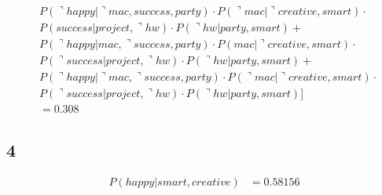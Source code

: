 \documentclass[letterpaper, 12pt]{artikel3}
\begin{document}
\begin{align*}
& P(\urcorner happy |\urcorner mac, success, party) \cdot P(\urcorner mac| \urcorner creative, smart) \cdot \\
& P(success | project,\urcorner hw) \cdot P(\urcorner hw| party, smart) +\\
& P(\urcorner happy |mac,\urcorner success, party) \cdot P(mac| \urcorner creative, smart) \cdot \\
& P(\urcorner success | project,\urcorner hw) \cdot P(\urcorner hw| party, smart) +\\
& P(\urcorner happy |\urcorner mac, \urcorner success, party) \cdot P(\urcorner mac| \urcorner creative, smart) \cdot \\
& P(\urcorner success | project, \urcorner hw) \cdot P(\urcorner hw| party, smart) ]\\
& = 0.308
\end{align*}



\subsection*{4}%
\begin{align*}
P(happy| smart, creative) &= 0.58156 \\
\end{align*}
\end{document}
